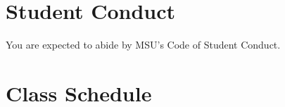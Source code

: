 \documentclass[letterpaper]{inzane_syllabus} %
\begin{document}
\vspace{0.4cm}
\section{Student Conduct}

You are expected to abide by MSU's Code of Student Conduct.
%
%



\newpage
\makeFullPage
\section{Class Schedule}

\end{document}
